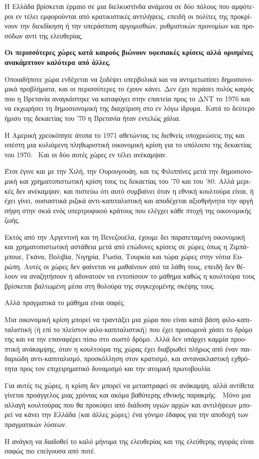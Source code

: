 \documentclass[11pt, twocolumn]{scrartcl}
\begin{document}
\begin{otherlanguage}{greek}
Η Ελλάδα βρίσκεται έρμαιο σε μια διελκυστίνδα ανάμεσα σε δύο πόλους που αμφότεροι εν τέλει εμφορούνται από κρατικιστικές αντιλήψεις, επειδή οι πολίτες της προκρίνουν την διεκδίκηση ή την υπεράσπιση αργομισθιών, ρυθμιστικών προνομίων και προσόδων αντί της ελευθερίας.

\textbf{Οι περισσότερες χώρες κατά καιρούς βιώνουν υφεσιακές κρίσεις αλλά ορισμένες ανα\-κά\-μπτουν καλύτερα από άλλες.}

Οποιαδήποτε χώρα ενδέχεται να ξοδέψει υπερβολικά και να αντιμετωπίσει δημοσιονομικά προβλήματα, και οι περισσότερες το έχουν κάνει.
Δεν έχει περάσει πολύς καιρός που η Βρετανία αναγκάστηκε να καταφύγει στην επαιτεία προς το ΔΝΤ το 1976 και να εκχωρήσει τη δημοσιονομική της διαχείριση στο εν λόγω ίδρυμα. Κατά το δεύτερο ήμισυ της δεκαετίας του '70 η Βρετανία ήταν εντελώς χάλια.

Η Αμερική χρεοκόπησε άτυπα το 1971 αθετώντας τις διεθνείς υποχρεώσεις της και υπέστη μια κυλιόμενη πληθωριστική οικονομική κρίση για το υπόλοιπο της δεκαετίας του 1970. 
Και οι δύο αυτές χώρες εν τέλει ανέκαμψαν.

Έτσι έγινε και με την Χιλή, την Ουρουγουάη, και τις Φιλιππίνες μετά την δημοσιονομική και χρηματοπιστωτική κρίση τους τις δεκαετίας του '70 και του '80.
Αλλά μερικές δεν ανέκαμψαν, και πιστεύω ότι αυτό συμβαίνει όταν η εθνική κουλτούρα είναι, ή έχει γίνει, ουσιαστικά ριζικά αντι-καπιταλιστική και αποδέχεται αξιοθρήνητα την αργή σήψη στην σκιά ενός υπερτροφικού κράτους που ελέγχει κάθε πτυχή της οικονομικής ζωής.

Εκτός από την Αργεντινή και τη Βενεζουέλα, έχουμε δει παρατεταμένη οικονομική και χρηματοπιστωτική αστάθεια μετά από επώδυνες κρίσεις σε χώρες όπως η Ζι\-μπά\-μπουε, Γκάνα, Βολιβία, Νιγηρία, Ρωσία, Τουρκία και τώρα χώρες στην νότια Ευρώπη.
Αυτές οι χώρες δεν φαίνεται να μα\-θαί\-νουν από τα λάθη τους, επειδή δεν θέλουν να αναζητήσουν ή αδυνατούν να ε\-ντο\-πί\-σουν το μάθημα καθώς η κουλτούρα τους βρίσκεται βαλτωμένη μέσα στη θολούρα της συγκεχυμένης σκέψης τους.

Αλλά πραγματικά το μάθημα είναι σαφές.

Μια οικονομική κρίση μπορεί να τρα\-ντά\-ξει μια χώρα που είναι κατά βάση φιλο-καπιταλιστική (ή επί το πλείστον φιλο-καπιταλιστική) που έχει προσωρινά χάσει το δρόμο της και να την επαναφέρει πίσω στο σωστό δρόμο.
Αλλά δεν υπάρχει καμμία προοπτική ανάκαμψης, όταν η κου\-λτού\-ρα της χώρας έχει διαβρωθεί πλήρως από έναν παιδαριώδη αντι-καπιταλισμό, προσκόλληση στον κρατισμό, και αντανακλαστική εχθρότητα προς τον επιχειρηματικό δυναμισμό και την ατομική πρωτοβουλία.

Για αυτές τις χώρες, η κρίση δεν μπορεί να μεταστραφεί σε ανάκαμψη, αλλά αντίθετα γίνεται προάγγελος μιας χρόνιας και ακόμα βαθύτερης εθνικής παρακμής. 
Μόνο μια αλλαγή κουλτούρας που θα προκύψει από διάδοση υγιών αρχών και αντιλήψεων μπορεί να κάνει την Ελλάδα (και άλλες χώρες) ένα γόνιμο έδαφος για την αποδοχή των πραγματικών λύσεων.

Η ανάγκη να διαδοθεί το καλό μήνυμα της ελευθερίας και της ελεύθερης αγοράς είναι σαφώς πιο επείγουσα από ποτέ.


\end{otherlanguage}
\end{document}
